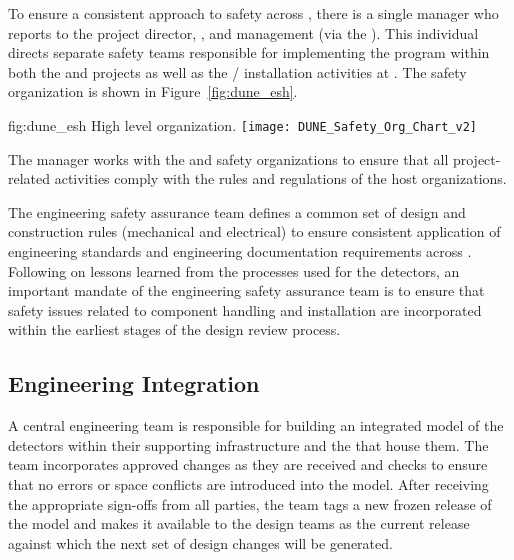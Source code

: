 To ensure a consistent approach to safety across ,
there is a single   manager who reports 
to the  project director, , and 
management (via the  ).  This individual
directs separate safety teams responsible for implementing the
  program within both the  
and  projects as well as the /
installation activities at . The safety organization 
is shown in Figure~\ref{fig:dune_esh}.

\begin{dunefigure}{fig:dune_esh}
  {High level   organization.}
  \texttt{[image: DUNE\_Safety\_Org\_Chart\_v2]}
\end{dunefigure}
The   manager works with the  
and  safety organizations to ensure that all project-related 
activities comply with the rules and regulations of the host 
organizations.  

The  engineering safety assurance team defines a common 
set of design and construction rules (mechanical and electrical) to 
ensure consistent application of engineering standards and engineering 
documentation requirements across .  
Following on lessons learned from the processes used for the 
 detectors, an important mandate of the engineering 
safety assurance team is to ensure that safety issues related to 
component handling and installation are incorporated within the 
earliest stages of the design review process.  

\subsection{Engineering Integration}   %
\label{sec:dune_engineering}


A central  engineering team is responsible for building 
an integrated model of the detectors within their supporting
infrastructure and the  that house them.  The  team incorporates approved changes as they 
are received and checks to ensure that no errors or space conflicts 
are introduced into the model.    After receiving the appropriate sign-offs from all 
parties, the  team tags a new frozen release of the model 
and makes it available to the design teams as the current release 
against which the next set of design changes will be generated.


